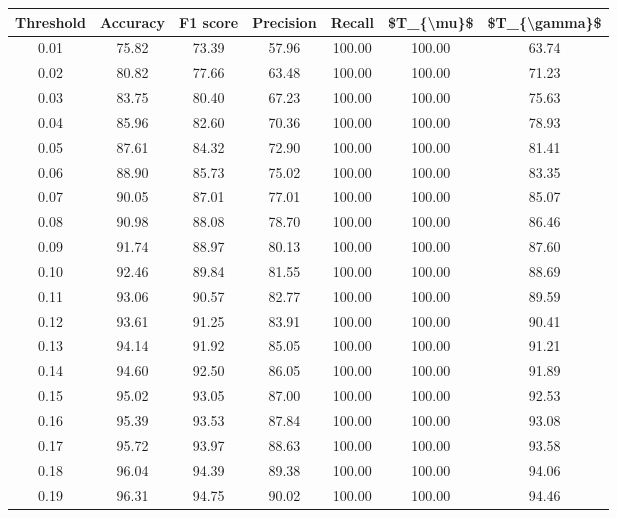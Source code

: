 \begin{tabular}{|c|c|c|c|c|c|c|}
\hline
 Threshold &  Accuracy &  F1 score &  Precision &  Recall &  \$T\_\{\textbackslash mu\}\$ &  \$T\_\{\textbackslash gamma\}\$ \\
\hline
      0.01 &     75.82 &     73.39 &      57.96 &  100.00 &     100.00 &         63.74 \\
      0.02 &     80.82 &     77.66 &      63.48 &  100.00 &     100.00 &         71.23 \\
      0.03 &     83.75 &     80.40 &      67.23 &  100.00 &     100.00 &         75.63 \\
      0.04 &     85.96 &     82.60 &      70.36 &  100.00 &     100.00 &         78.93 \\
      0.05 &     87.61 &     84.32 &      72.90 &  100.00 &     100.00 &         81.41 \\
      0.06 &     88.90 &     85.73 &      75.02 &  100.00 &     100.00 &         83.35 \\
      0.07 &     90.05 &     87.01 &      77.01 &  100.00 &     100.00 &         85.07 \\
      0.08 &     90.98 &     88.08 &      78.70 &  100.00 &     100.00 &         86.46 \\
      0.09 &     91.74 &     88.97 &      80.13 &  100.00 &     100.00 &         87.60 \\
      0.10 &     92.46 &     89.84 &      81.55 &  100.00 &     100.00 &         88.69 \\
      0.11 &     93.06 &     90.57 &      82.77 &  100.00 &     100.00 &         89.59 \\
      0.12 &     93.61 &     91.25 &      83.91 &  100.00 &     100.00 &         90.41 \\
      0.13 &     94.14 &     91.92 &      85.05 &  100.00 &     100.00 &         91.21 \\
      0.14 &     94.60 &     92.50 &      86.05 &  100.00 &     100.00 &         91.89 \\
      0.15 &     95.02 &     93.05 &      87.00 &  100.00 &     100.00 &         92.53 \\
      0.16 &     95.39 &     93.53 &      87.84 &  100.00 &     100.00 &         93.08 \\
      0.17 &     95.72 &     93.97 &      88.63 &  100.00 &     100.00 &         93.58 \\
      0.18 &     96.04 &     94.39 &      89.38 &  100.00 &     100.00 &         94.06 \\
      0.19 &     96.31 &     94.75 &      90.02 &  100.00 &     100.00 &         94.46 \\

\end{tabular}
